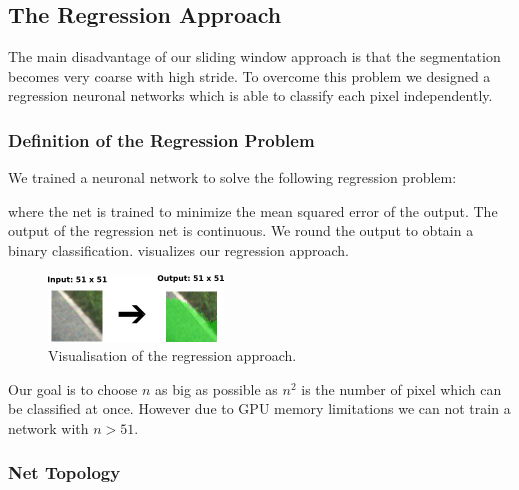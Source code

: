 \subsection{The Regression Approach}

The main disadvantage of our sliding window approach is that the segmentation becomes very coarse with high stride. To overcome this problem we designed a regression neuronal networks which is able to classify each pixel independently.

\subsubsection{Definition of the Regression Problem}

We trained a neuronal network to solve the following regression problem:


where the net is trained to minimize the mean squared error of the output. The output of the regression net is continuous. We round the output to obtain a binary classification.   visualizes our regression approach.

\begin{figure}[H]
	\centering
	\includegraphics[width=0.5\columnwidth]{figures/models/fully-conv.png}
	\caption{Visualisation of the regression approach.}
	\label{fig:reg}
\end{figure}

Our goal is to choose $n$ as big as possible as $n^2$ is the number of pixel which can be classified at once. However due to GPU memory limitations we can not train a network with $n > 51$.





\subsubsection{Net Topology}

